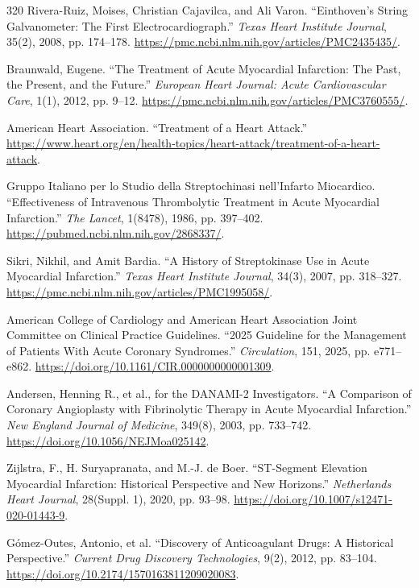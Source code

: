 \documentclass[12pt,oneside]{book}
\begin{document}
\begin{thebibliography}{320}
Rivera-Ruiz, Moises, Christian Cajavilca, and Ali Varon. ``Einthoven's
String Galvanometer: The First Electrocardiograph.'' \emph{Texas Heart
Institute Journal}, 35(2), 2008, pp. 174--178.
\url{https://pmc.ncbi.nlm.nih.gov/articles/PMC2435435/}.

Braunwald, Eugene. ``The Treatment of Acute Myocardial Infarction: The
Past, the Present, and the Future.'' \emph{European Heart Journal: Acute
Cardiovascular Care}, 1(1), 2012, pp. 9--12.
\url{https://pmc.ncbi.nlm.nih.gov/articles/PMC3760555/}.

American Heart Association. ``Treatment of a Heart Attack.''
\url{https://www.heart.org/en/health-topics/heart-attack/treatment-of-a-heart-attack}.

Gruppo Italiano per lo Studio della Streptochinasi nell'Infarto Miocardico.
``Effectiveness of Intravenous Thrombolytic Treatment in Acute Myocardial
Infarction.'' \emph{The Lancet}, 1(8478), 1986, pp. 397--402.
\url{https://pubmed.ncbi.nlm.nih.gov/2868337/}.

Sikri, Nikhil, and Amit Bardia. ``A History of Streptokinase Use in Acute
Myocardial Infarction.'' \emph{Texas Heart Institute Journal}, 34(3), 2007,
pp. 318--327. \url{https://pmc.ncbi.nlm.nih.gov/articles/PMC1995058/}.

American College of Cardiology and American Heart Association Joint
Committee on Clinical Practice Guidelines. ``2025 Guideline for the
Management of Patients With Acute Coronary Syndromes.'' \emph{Circulation},
151, 2025, pp. e771--e862.
\url{https://doi.org/10.1161/CIR.0000000000001309}.

Andersen, Henning R., et al., for the DANAMI-2 Investigators. ``A Comparison
of Coronary Angioplasty with Fibrinolytic Therapy in Acute Myocardial
Infarction.'' \emph{New England Journal of Medicine}, 349(8), 2003,
pp. 733--742. \url{https://doi.org/10.1056/NEJMoa025142}.

Zijlstra, F., H. Suryapranata, and M.-J. de Boer. ``ST-Segment Elevation
Myocardial Infarction: Historical Perspective and New Horizons.''
\emph{Netherlands Heart Journal}, 28(Suppl. 1), 2020, pp. 93--98.
\url{https://doi.org/10.1007/s12471-020-01443-9}.

G\'omez-Outes, Antonio, et al. ``Discovery of Anticoagulant Drugs: A
Historical Perspective.'' \emph{Current Drug Discovery Technologies}, 9(2),
2012, pp. 83--104. \url{https://doi.org/10.2174/1570163811209020083}.


\end{thebibliography}
\end{document}
